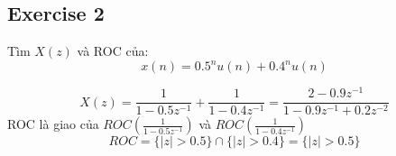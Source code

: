 \subsection{Exercise 2}
Tìm $X(z)$ và ROC của:
\[
x(n) = 0.5^n u(n) + 0.4^n u(n)
\]

\[
X(z) = \frac{1}{1-0.5z^{-1}} + \frac{1}{1-0.4z^{-1}} 
= \frac{2 - 0.9z^{-1}}{1 - 0.9z^{-1} + 0.2z^{-2}}
\]
ROC là giao của $ROC\left(\frac{1}{1-0.5z^{-1}}\right)$ và $ROC\left(\frac{1}{1-0.4z^{-1}} \right)$
\[
ROC = \{|z|>0.5\} \cap \{|z|>0.4\} = \{|z|>0.5\}
\]